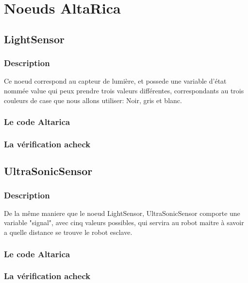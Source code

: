  \section{Noeuds AltaRica}
 
  \subsection{LightSensor}
  
   \subsubsection{Description}
   Ce noeud correspond au capteur de lumière, et possede une variable
   d'état nommée value qui peux prendre trois valeurs différentes,
   correspondants au trois couleurs de case que nous allons utiliser:
   Noir, gris et blanc. 

   \subsubsection{Le code Altarica}
   
   
   \subsubsection{La vérification acheck}
   
   
  \subsection{UltraSonicSensor}
  
   \subsubsection{Description}
   De la même maniere que le noeud LightSensor, UltraSonicSensor
   comporte une variable "signal", avec cinq valeurs possibles, qui
   servira au robot maitre à savoir a quelle distance se trouve le robot
   esclave.

   \subsubsection{Le code Altarica}
   
   
   \subsubsection{La vérification acheck}
   
